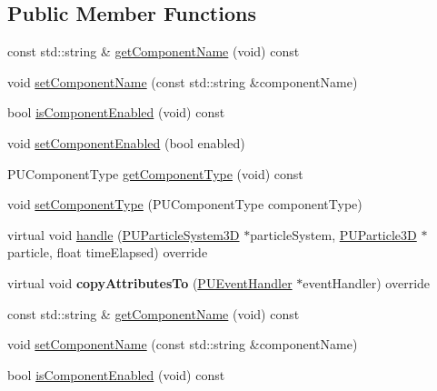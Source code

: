 \subsection*{Public Member Functions}
\begin{DoxyCompactItemize}
\item 
const std\+::string \& \hyperlink{classPUDoEnableComponentEventHandler_a23bf802ebb2b12be1d98c2841a2f62ea}{get\+Component\+Name} (void) const
\item 
void \hyperlink{classPUDoEnableComponentEventHandler_ae109d2c4b1356e30183884ed85fd2400}{set\+Component\+Name} (const std\+::string \&component\+Name)
\item 
bool \hyperlink{classPUDoEnableComponentEventHandler_a672806e3c52023c95646c1841a021b3d}{is\+Component\+Enabled} (void) const
\item 
void \hyperlink{classPUDoEnableComponentEventHandler_a1ea8207ead0eb09e3ff94743b3eef5ad}{set\+Component\+Enabled} (bool enabled)
\item 
P\+U\+Component\+Type \hyperlink{classPUDoEnableComponentEventHandler_aa0d64a91748ab3c16cd64843731be197}{get\+Component\+Type} (void) const
\item 
void \hyperlink{classPUDoEnableComponentEventHandler_a1d7742b4e01e3de32d6fb93952028353}{set\+Component\+Type} (P\+U\+Component\+Type component\+Type)
\item 
virtual void \hyperlink{classPUDoEnableComponentEventHandler_a1c27b9000122f25304629fd2487c6e50}{handle} (\hyperlink{classPUParticleSystem3D}{P\+U\+Particle\+System3D} $\ast$particle\+System, \hyperlink{structPUParticle3D}{P\+U\+Particle3D} $\ast$particle, float time\+Elapsed) override
\item 
\mbox{\label{classPUDoEnableComponentEventHandler_a350437c240139d68e33fb30e235b43b5}} 
virtual void {\bfseries copy\+Attributes\+To} (\hyperlink{classPUEventHandler}{P\+U\+Event\+Handler} $\ast$event\+Handler) override
\item 
const std\+::string \& \hyperlink{classPUDoEnableComponentEventHandler_a23bf802ebb2b12be1d98c2841a2f62ea}{get\+Component\+Name} (void) const
\item 
void \hyperlink{classPUDoEnableComponentEventHandler_ae109d2c4b1356e30183884ed85fd2400}{set\+Component\+Name} (const std\+::string \&component\+Name)
\item 
bool \hyperlink{classPUDoEnableComponentEventHandler_a672806e3c52023c95646c1841a021b3d}{is\+Component\+Enabled} (void) const

\end{DoxyCompactItemize}
